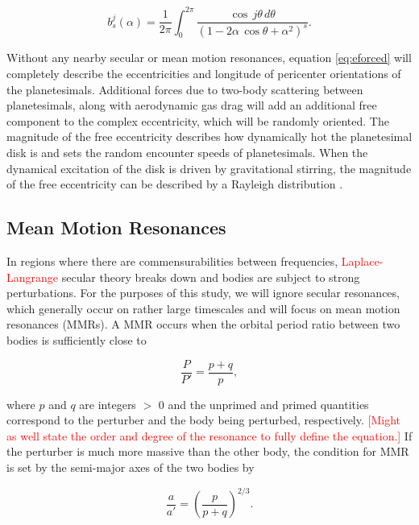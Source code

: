 \documentclass[twocolumn]{aastex63}
\newcommand{\ACBc}[1]{\textcolor{red}{#1}}
\begin{document}
\begin{equation}\label{eq:lap}
	b_{s}^{j}(\alpha) = \frac{1}{2 \pi} \int_{0}^{2 \pi} \frac{\cos \, j \theta \, d \theta}{\left( 1 - 2 \alpha \, \cos \theta + \alpha^2 \right)^{s}}.
\end{equation}

Without any nearby secular or mean motion resonances, equation \ref{eq:eforced} will completely describe the eccentricities and longitude of  
pericenter orientations of the planetesimals. Additional forces due to two-body scattering between planetesimals, along with 
aerodynamic gas drag will add an additional free component to the complex eccentricity, which will be randomly oriented. The 
magnitude of the free eccentricity describes how dynamically hot the planetesimal disk is and sets the random encounter speeds of 
planetesimals. When the dynamical excitation of the disk is driven by gravitational stirring, the magnitude of the free eccentricity can 
be described by a Rayleigh distribution \citep{1992Icar...96..107I}.

\subsection{Mean Motion Resonances}

In regions where there are commensurabilities between frequencies, \ACBc{Laplace-Langrange} secular theory breaks down and bodies are subject to strong 
perturbations. For the purposes of this study, we will ignore secular resonances, which generally occur on rather large timescales 
and will focus on mean motion resonances (MMRs). A MMR occurs  when the orbital period ratio between two bodies is sufficiently 
close to

\begin{equation}\label{eq:per_mmr}
	\frac{P}{P'} = \frac{p + q}{p},
\end{equation}

\noindent where  $p$ and $q$ are integers $>$ 0 and the unprimed and primed quantities correspond to the perturber and the body 
being perturbed, respectively. \ACBc{[Might as well state the order and degree of the resonance to fully define the equation.]} If the perturber is much more massive than the other body, the condition for MMR is set  by the semi-major 
axes of the two bodies by

\begin{equation}\label{eq:a_mmr}
	\frac{a}{a'} = \left( \frac{p}{p + q} \right)^{2/3}.
\end{equation}
\end{document}
